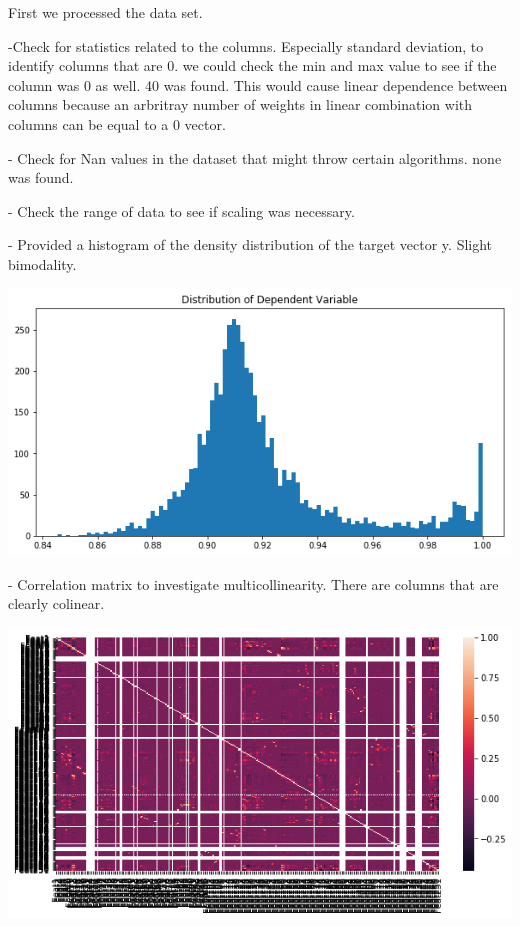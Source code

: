 \documentclass[11pt]{article}
\begin{document}
First we processed the data set.

-Check for statistics related to the columns. Especially standard deviation, to identify columns that are 0. we could check the min and max value to see if the column was 0 as well. 40 was found. This would cause linear dependence between columns because an arbritray number of weights in linear combination with columns can be equal to a 0 vector. 

- Check for Nan values in the dataset that might throw certain algorithms. none was found.

- Check the range of data to see if scaling was necessary.

- Provided a histogram of the density distribution of the target vector y. Slight bimodality. 
\begin{center}
	\includegraphics[scale=0.6]{target_density}
\end{center}

- Correlation matrix to investigate multicollinearity. There are columns that are clearly colinear. 
\begin{center}
	\includegraphics[scale=0.6]{corr_matrix}
\end{center}
\end{document}

